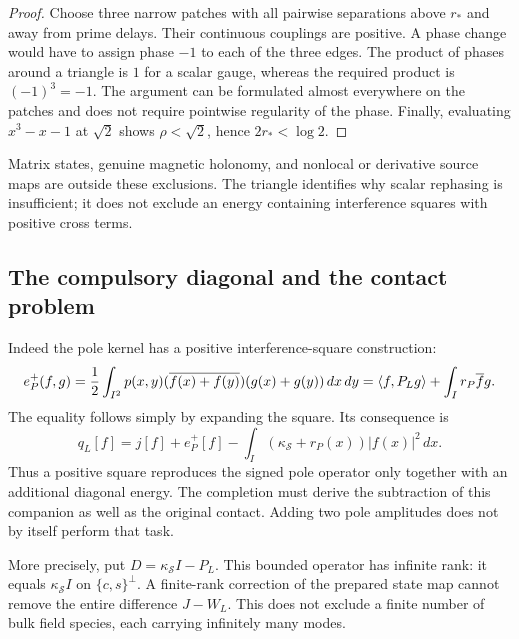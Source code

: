 \begin{proof}
Choose three narrow patches with all pairwise separations above $r_*$ and
away from prime delays.  Their continuous couplings are positive.  A phase
change would have to assign phase $-1$ to each of the three edges.
The product of phases around a triangle is $1$ for a scalar gauge, whereas
the required product is $(-1)^3=-1$.  The argument can be formulated almost
everywhere on the patches and does not require pointwise regularity of the
phase.  Finally, evaluating $x^3-x-1$ at $\sqrt2$ shows
$\rho<\sqrt2$, hence $2r_*<\log2$.
\end{proof}

Matrix states, genuine magnetic holonomy, and nonlocal or derivative source
maps are outside these exclusions.  The triangle identifies why scalar
rephasing is insufficient; it does not exclude an energy containing
interference squares with positive cross terms.

\subsection{The compulsory diagonal and the contact problem}

Indeed the pole kernel has a positive interference-square construction:
\begin{equation}
 e_P^+(f,g)=\frac12\int_{I^2}p(x,y)
 (\overline{f(x)+f(y)})(g(x)+g(y))\,dx\,dy
 =\left\langle f,P_Lg\right\rangle+\int_I r_P\overline f g.
 \label{obs-positive-pole-square}
\end{equation}
The equality follows simply by expanding the square.  Its consequence is
\begin{equation}
 q_L[f]=j[f]+e_P^+[f]
       -\int_I(\kappa_{\mathcal S}+r_P(x))|f(x)|^2\,dx.
 \label{obs-compulsory-diagonal}
\end{equation}
Thus a positive square reproduces the signed pole operator only together
with an additional diagonal energy.  The completion must derive the
subtraction of this companion as well as the original contact.  Adding two
pole amplitudes does not by itself perform that task.

More precisely, put $D=\kappa_{\mathcal S}I-P_L$.  This bounded operator has
infinite rank: it equals $\kappa_{\mathcal S}I$ on
$\{c,s\}^{\perp}$.  A finite-rank correction of the prepared state map
cannot remove the entire difference $J-W_L$.  This does not exclude a
finite number of bulk field species, each carrying infinitely many modes.

